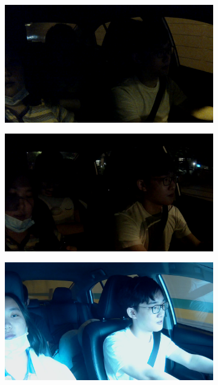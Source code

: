 \begin{figure}[t]
\begin{subfigure}[b]{0.22\textwidth}
\end{subfigure}
\begin{subfigure}[b]{0.22\textwidth}
    \includegraphics[width=\textwidth]{figures/car_4}
\end{subfigure}
\begin{subfigure}[b]{0.22\textwidth}
    \includegraphics[width=\textwidth]{figures/car_5}
\end{subfigure}
\begin{subfigure}[b]{0.22\textwidth}
    \includegraphics[width=\textwidth]{figures/car_6}

\end{subfigure}
\end{figure}
